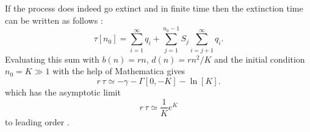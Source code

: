 If the process does indeed go extinct and in finite time then the extinction time can be written as follows \cite{Nisbet1982}:
\begin{equation} \label{etime-approx0}
\tau[n_0] = \sum_{i=1}^{\infty}q_i + \sum_{j=1}^{n_0-1} S_j\sum_{i=j+1}^{\infty}q_i.
\end{equation}
Evaluating this sum with $b(n)=r n$, $d(n)=rn^2/K$ and the initial condition $n_0 = K \gg 1$ with the help of Mathematica gives
\begin{equation*}
r\,\tau \simeq -\gamma - \Gamma[0,-K] - \ln[K].
\end{equation*}
which has the asymptotic limit
\begin{equation} \label{1Dlog}
r\,\tau \simeq \frac{1}{K}e^K
\end{equation}
to leading order \cite{Lande1993}.
\fi

